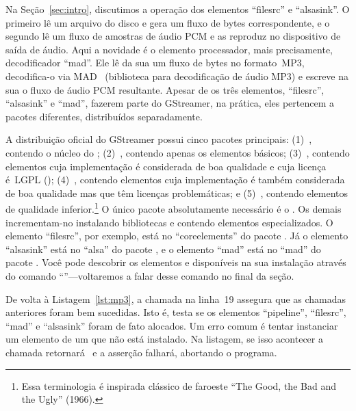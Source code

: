 \documentclass{SBCbookchapter}
\begin{document}


\clearpage
Na Seção~\ref{sec:intro}, discutimos a operação dos elementos ``filesrc'' e
``alsasink''.  O primeiro lê um arquivo do disco e gera um fluxo de bytes
correspondente, e o segundo lê um fluxo de amostras de áudio PCM e as
reproduz no dispositivo de saída de áudio.  Aqui a novidade é o elemento
processador, mais precisamente, decodificador ``mad''.  Ele lê da sua
 um fluxo de bytes no formato~MP3, decodifica-o via
MAD~\cite{mad} (biblioteca para decodificação de áudio MP3) e escreve na sua
 o fluxo de áudio PCM resultante.  Apesar de os três elementos,
``filesrc'', ``alsasink'' e ``mad'', fazerem parte do GStreamer, na prática,
eles pertencem a pacotes diferentes, distribuídos separadamente.

A distribuição oficial do GStreamer possui cinco pacotes principais:
(1)~, contendo o núcleo do ;
(2)~, contendo apenas os elementos básicos;
(3)~, contendo elementos cuja implementação é
considerada de boa qualidade e cuja licença é~LGPL (); (4)~, contendo elementos cuja
implementação é também considerada de boa qualidade mas que têm licenças
problemáticas; e (5)~, contendo elementos de qualidade
inferior.\footnote{Essa terminologia é inspirada clássico de faroeste ``The
  Good, the Bad and the Ugly'' (1966).}  O único pacote absolutamente
necessário é o .  Os demais incrementam-no instalando
bibliotecas e  contendo elementos especializados.  O elemento
``filesrc'', por exemplo, está no  ``coreelements'' do pacote
.  Já o elemento ``alsasink'' está no  ``alsa'' do
pacote , e o elemento ``mad'' está no 
``mad'' do pacote .  Você pode descobrir os elementos e
 disponíveis na sua instalação através do comando
``''---voltaremos a falar desse comando no final da seção.

De volta à Listagem~\ref{lst:mp3}, a chamada  na linha~19
assegura que as chamadas  anteriores foram bem
sucedidas.  Isto é, testa se os elementos ``pipeline'', ``filesrc'', ``mad''
e ``alsasink'' foram de fato alocados.  Um erro comum é tentar instanciar um
elemento de um  que não está instalado.  Na listagem, se isso
acontecer a chamada  retornará~ e a
asserção falhará, abortando o programa.
\end{document}
